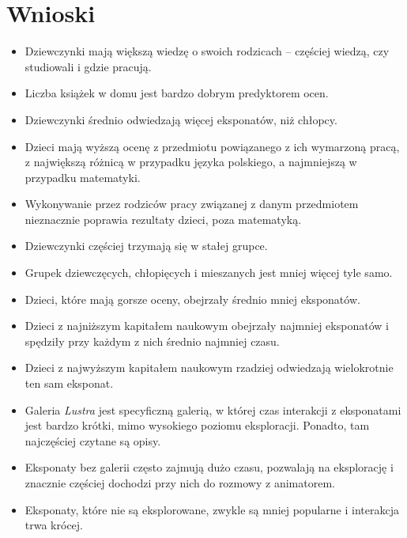 \documentclass[conference]{IEEEtran}
\begin{document}
\section{Wnioski}
\begin{itemize}
\item Dziewczynki mają większą wiedzę o swoich rodzicach -- częściej wiedzą, czy studiowali i gdzie pracują.
\item Liczba książek w domu jest bardzo dobrym predyktorem ocen.
\item Dziewczynki średnio odwiedzają więcej eksponatów, niż chłopcy.
\item Dzieci mają wyższą ocenę z przedmiotu powiązanego z ich wymarzoną pracą, z największą różnicą w przypadku języka polskiego, a najmniejszą w przypadku matematyki.
\item Wykonywanie przez rodziców pracy związanej z danym przedmiotem nieznacznie poprawia rezultaty dzieci, poza matematyką.
\item Dziewczynki częściej trzymają się w stałej grupce.
\item Grupek dziewczęcych, chłopięcych i mieszanych jest mniej więcej tyle samo.
\item Dzieci, które mają gorsze oceny, obejrzały średnio mniej eksponatów.
\item Dzieci z najniższym kapitałem naukowym obejrzały najmniej eksponatów i spędziły przy każdym z nich średnio najmniej czasu.
\item Dzieci z najwyższym kapitałem naukowym rzadziej odwiedzają wielokrotnie ten sam eksponat.
\item Galeria \textit{Lustra} jest specyficzną galerią, w której czas interakcji z eksponatami jest bardzo krótki, mimo wysokiego poziomu eksploracji. Ponadto, tam najczęściej czytane są opisy.
\item Eksponaty bez galerii często zajmują dużo czasu, pozwalają na eksplorację i znacznie częściej dochodzi przy nich do rozmowy z animatorem.
\item Eksponaty, które nie są eksplorowane, zwykle są mniej popularne i interakcja trwa krócej.
\end{itemize}
\end{document}

